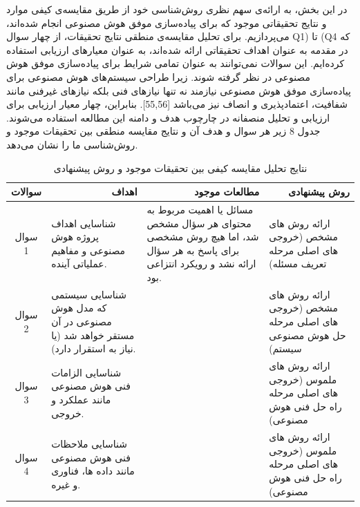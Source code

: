 \documentclass[a4paper,10pt]{article}
\begin{document}
                    در این بخش، به ارائه‌ی سهم نظری روش‌شناسی خود از طریق مقایسه‌ی کیفی موارد و نتایج تحقیقاتی موجود که برای پیاده‌سازی موفق هوش مصنوعی انجام شده‌اند، می‌پردازیم. برای تحلیل مقایسه‌ی منطقی نتایج تحقیقات، از چهار سوال Q1) تا (Q4 که در مقدمه به عنوان اهداف تحقیقاتی ارائه شده‌اند، به عنوان معیارهای ارزیابی استفاده کرده‌ایم. این سوالات نمی‌توانند به عنوان تمامی شرایط برای پیاده‌سازی موفق هوش مصنوعی در نظر گرفته شوند. زیرا طراحی سیستم‌های هوش مصنوعی برای پیاده‌سازی موفق هوش مصنوعی نیازمند نه تنها نیازهای فنی بلکه نیازهای غیرفنی مانند شفافیت، اعتمادپذیری و انصاف نیز می‌باشد [55,56]. بنابراین، چهار معیار ارزیابی برای ارزیابی و تحلیل منصفانه در چارچوب هدف و دامنه این مطالعه استفاده می‌شوند. جدول 8 زیر هر سوال و هدف آن و نتایج مقایسه منطقی بین تحقیقات موجود و روش‌شناسی ما را نشان می‌دهد.

                    \begin{table}[htbp]
                        
                        \centering
                        \caption{نتایج تحلیل مقایسه کیفی بین تحقیقات موجود و روش پیشنهادی}
                        \begin{tabularx}{\textwidth}{ c X X X }
                            
                            \hline

                            \multicolumn{1}{c}{سوالات} & \multicolumn{1}{r}{اهداف} & \multicolumn{1}{r}{مطالعات موجود} & \multicolumn{1}{r}{روش پیشنهادی} \\

                            \hline

                            \multicolumn{1}{c}{سوال 1} & شناسایی اهداف پروژه هوش مصنوعی و مفاهیم عملیاتی آینده. & مسائل یا اهمیت مربوط به محتوای هر سؤال مشخص شد، اما هیچ روش مشخصی برای پاسخ به هر سؤال ارائه نشد و رویکرد انتزاعی بود. & ارائه روش های مشخص (خروجی های اصلی مرحله تعریف مسئله) \\
                            \multicolumn{1}{c}{سوال 2} & شناسایی سیستمی که مدل هوش مصنوعی در آن مستقر خواهد شد (یا نیاز به استقرار دارد). &  & ارائه روش های مشخص (خروجی های اصلی مرحله حل هوش مصنوعی سیستم) \\
                            \multicolumn{1}{c}{سوال 3} & شناسایی الزامات فنی هوش مصنوعی مانند عملکرد و خروجی. &  & ارائه روش های ملموس (خروجی های اصلی مرحله راه حل فنی هوش مصنوعی) \\
                            \multicolumn{1}{c}{سوال 4} & شناسایی ملاحظات فنی هوش مصنوعی مانند داده ها، فناوری و غیره. &  & ارائه روش های ملموس (خروجی های اصلی مرحله راه حل فنی هوش مصنوعی) \\
                            
                            \hline

                        \end{tabularx}
                        
                    \end{table}
\end{document}
